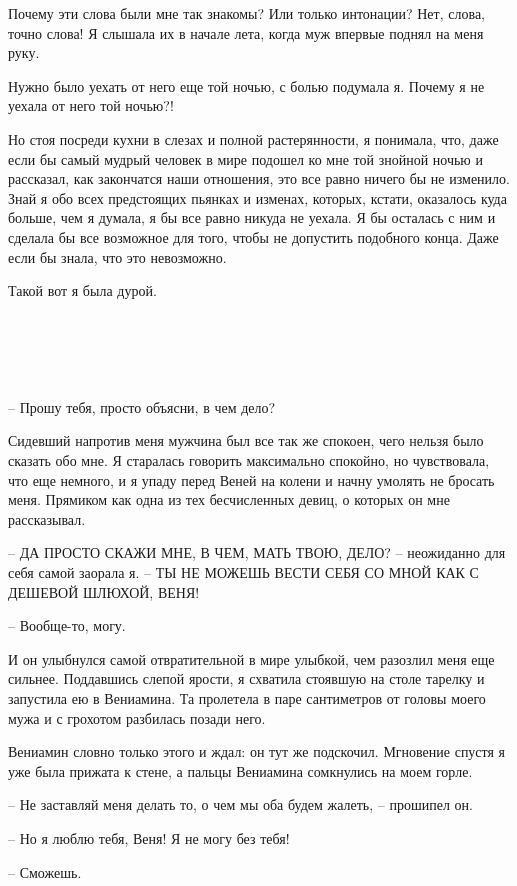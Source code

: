 \documentclass[
]{book}
\begin{document}
Почему эти слова были мне так знакомы? Или только интонации? Нет, слова, точно слова! Я слышала их в начале лета, когда муж впервые поднял на меня руку.

Нужно было уехать от него еще той ночью, с болью подумала я. Почему я не уехала от него той ночью?!

Но стоя посреди кухни в слезах и полной растерянности, я понимала, что, даже если бы самый мудрый человек в мире подошел ко мне той знойной ночью и рассказал, как закончатся наши отношения, это все равно ничего бы не изменило. Знай я обо всех предстоящих пьянках и изменах, которых, кстати, оказалось куда больше, чем я думала, я бы все равно никуда не уехала. Я бы осталась с ним и сделала бы все возможное для того, чтобы не допустить подобного конца. Даже если бы знала, что это невозможно.

Такой вот я была дурой.

\hypertarget{chapter-85}{%
\chapter{~}\label{chapter-85}}

-- Прошу тебя, просто объясни, в чем дело?

Сидевший напротив меня мужчина был все так же спокоен, чего нельзя было сказать обо мне. Я старалась говорить максимально спокойно, но чувствовала, что еще немного, и я упаду перед Веней на колени и начну умолять не бросать меня. Прямиком как одна из тех бесчисленных девиц, о которых он мне рассказывал.

-- ДА ПРОСТО СКАЖИ МНЕ, В ЧЕМ, МАТЬ ТВОЮ, ДЕЛО? -- неожиданно для себя самой заорала я. -- ТЫ НЕ МОЖЕШЬ ВЕСТИ СЕБЯ СО МНОЙ КАК С ДЕШЕВОЙ ШЛЮХОЙ, ВЕНЯ!

-- Вообще-то, могу.

И он улыбнулся самой отвратительной в мире улыбкой, чем разозлил меня еще сильнее. Поддавшись слепой ярости, я схватила стоявшую на столе тарелку и запустила ею в Вениамина. Та пролетела в паре сантиметров от головы моего мужа и с грохотом разбилась позади него.

Вениамин словно только этого и ждал: он тут же подскочил. Мгновение спустя я уже была прижата к стене, а пальцы Вениамина сомкнулись на моем горле.

-- Не заставляй меня делать то, о чем мы оба будем жалеть, -- прошипел он.

-- Но я люблю тебя, Веня! Я не могу без тебя!

-- Сможешь.
\end{document}
